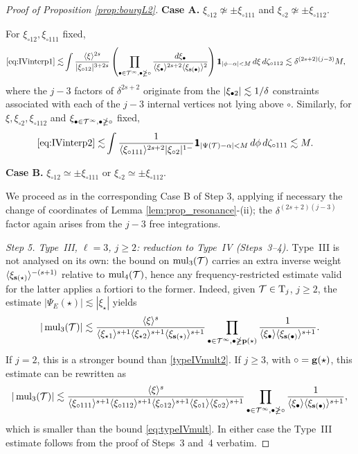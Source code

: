 \begin{proof}[Proof of Proposition \ref{prop:bourgL2}]
\smallskip
\noi\textbf{Case A.} $\xi_{\circ12}\not\simeq \pm \xi_{\circ111}$ and $\xi_{\circ2}\not\simeq \pm \xi_{\circ112}$.

\noi For $\xi_{\circ12}, \xi_{\circ111}$ fixed,
\begin{align*}
\eqref{eq:IVinterp1}\lesssim & \int \frac{\jap{\xi}^{2s}}{|\xi_{\circ12}|^{3+2s}}\left(\prod_{\bul\in\TT^\infty, \bul\ngeq\circ} \frac{d\xi_\bul}{\jap{\xi_\bul}^{2s+2}\jap{\xi_{\sbf(\bul)}}^2}\right) \ind_{|\phi-\alpha|<M}\,d\xi\, d\zeta_{\circ112}\lesssim \delta^{(2s+2)(j-3)}M,
\end{align*}
where the $j-3$ factors of $\delta^{2s+2}$ originate from the $|\xi_{\bullet 2}|\lesssim 1/\delta$ constraints associated with each of the $j-3$ internal vertices not lying above $\circ$.
Similarly, for $\xi, \xi_{\circ2}, \xi_{\circ112}$ and $\xi_{\bullet\in \mathcal{T}^\infty, \bullet\ngeq \circ}$ fixed,
\begin{align*}
\eqref{eq:IVinterp2} \lesssim & \int \frac{1}{\jap{\xi_{\circ111}}^{2s+2}|\xi_{\circ2}|^{1-}}\ind_{|\Psi(\TT)-\alpha|<M}\, d\phi\, d\zeta_{\circ111} \lesssim M.
\end{align*}

\smallskip
\noi
\textbf{Case B.} $\xi_{\circ12}\simeq \pm \xi_{\circ111}$ or $\xi_{\circ2}\simeq \pm \xi_{\circ112}$.

\noi We proceed as in the corresponding Case B of Step 3, applying if necessary the change of coordinates of Lemma \ref{lem:prop_resonance}-(ii); the $\delta^{(2s+2)(j-3)}$ factor again arises from the $j-3$ free integrations.

\medskip
\noi\textit{Step 5. Type~III, $\ell=3$, $j\ge 2$: reduction to Type~IV (Steps~3--4).}
Type~III is not analysed on its own: the bound on $\operatorname{mul}_3(\mathcal{T})$ carries an extra inverse weight $\langle \xi_{\mathbf{s}(\star)} \rangle^{-(s+1)}$ relative to $\operatorname{mul}_4(\mathcal{T})$, hence any frequency-restricted estimate valid for the latter applies a fortiori to the former.
Indeed, given $\mathcal{T}\in \mathrm{T}_j$, $j\ge 2$, the estimate $|\Psi_E(\star)|\lesssim |\xi_\star|$ yields
$$
|\operatorname{mul}_3(\mathcal{T})|\lesssim \frac{\langle \xi \rangle^{s}}{\langle \xi_{\star1} \rangle^{s+1}\langle \xi_{\star2} \rangle^{s+1}\langle \xi_{\mathbf{s}(\star)} \rangle^{s+1}}\prod_{\bullet \in \mathcal{T}^\infty, \bullet\ngeq \mathbf{p}(\star)}\frac{1}{\langle \xi_{\bullet} \rangle\langle \xi_{\mathbf{s}(\bullet)} \rangle^{s+1}}.
$$
If $j=2$, this is a stronger bound than \eqref{typeIVmult2}.
If $j\ge 3$, with $\circ=\mathbf{g}(\star)$, this estimate can be rewritten as
$$
|\operatorname{mul}_3(\mathcal{T})|\lesssim \frac{\langle \xi \rangle^s}{\langle \xi_{\circ111} \rangle^{s+1}\langle \xi_{\circ112} \rangle^{s+1}\langle \xi_{\circ12} \rangle^{s+1}\langle \xi_{\circ1} \rangle\langle \xi_{\circ2} \rangle^{s+1}} \prod_{\bullet \in \mathcal{T}^\infty, \bullet\ngeq \circ}\frac{1}{\langle \xi_{\bullet} \rangle\langle \xi_{\mathbf{s}(\bullet)} \rangle^{s+1}},
$$
which is smaller than the bound \eqref{eq:typeIVmult}. In either case the Type~III estimate follows from the proof of Steps~3 and~4 verbatim.


\end{proof}
